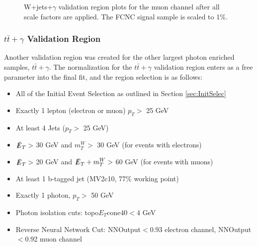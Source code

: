 \begin{figure}[h!]
\hfil  
{}
\caption{W+jets+$\gamma$ validation region plots for the muon channel after all scale factors are applied.  The FCNC signal sample is scaled to 1\%.} %
\label{fig:VR1muj}
\end{figure}

\subsubsection{$t\bar{t}+\gamma$ Validation Region}
Another validation region was created for the other largest photon enriched samples, $t\bar{t}+\gamma$. The normalization for the $t\bar{t}+\gamma$ validation region enters as a free parameter into the final fit, and the region selection is as follows:
\begin{itemize}
\item All of the Initial Event Selection as outlined in Section \ref{sec:InitSelec}
\item Exactly 1 lepton (electron or muon) $p_T >$ 25 GeV
\item At least 4 Jets  ($p_T >$ 25 GeV) 
\item $\slashed{E}_T >$ 30 GeV and $m_T^W >$ 30 GeV (for events with electrons)
\item $\slashed{E}_T >$ 20 GeV and $\slashed{E}_T + m_T^W >$ 60 GeV (for events with muons)
\item At least 1 b-tagged jet (MV2c10, 77\% working point)
\item Exactly 1 photon, $p_T >$ 50 GeV
\item Photon isolation cuts: topo$E_T$cone40$<$4 GeV
\item Reverse Neural Network Cut: NNOutput$<$0.93 electron channel, NNOutput$<$0.92 muon channel
\end{itemize}

